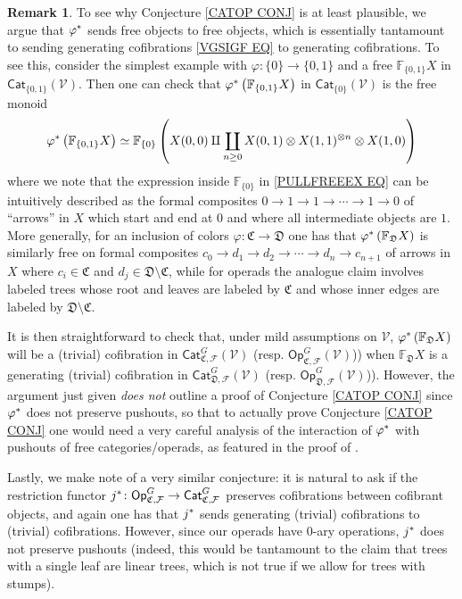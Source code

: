 \documentclass[a4paper,10pt
,draft
]{article}%
\numberwithin{equation}{section}
\numberwithin{figure}{section}
\theoremstyle{definition} %
\newtheorem{remark}[equation]{Remark}%
\newcommand{\F}{\ensuremath{\mathcal F}}
\newcommand{\V}{\ensuremath{\mathcal V}}
\newcommand{\1}{\ensuremath{\mathbbm 1}}%
\begin{document}
\begin{remark}
To see why Conjecture \ref{CATOP CONJ} is at least plausible,
we argue that $\varphi^{\**}$ sends free objects to free objects, 
which is essentially tantamount to
sending generating cofibrations \eqref{VGSIGF EQ} to generating cofibrations.
%
To see this, consider the simplest example 
with
$\varphi \colon \{0\} \to \{0,1\}$
and a free $\mathbb{F}_{\{0,1\}}X $ in $\mathsf{Cat}_{\{0,1\}}(\V)$.
Then one can check that 
$\varphi^{\**} \left( \mathbb{F}_{\{0,1\}}X \right)$ in $\mathsf{Cat}_{\{0\}}(\V)$ is the free monoid
\begin{equation}\label{PULLFREEEX EQ}
	\varphi^{\**} \left( \mathbb{F}_{\{0,1\}}X \right)
\simeq
	\mathbb{F}_{\{0\}}
	\left(X(0,0) \amalg 
	\coprod_{n \geq 0}
	X(0,1)\otimes X(1,1)^{\otimes n} \otimes X(1,0) 
	\right)
\end{equation}
where we note that the expression inside
$\mathbb{F}_{\{0\}}$
in \eqref{PULLFREEEX EQ}
can be intuitively described as the formal composites
$0 \to 1 \to 1 \to \cdots \to 1 \to 0$
of ``arrows'' in $X$ which start and end at $0$ and where all intermediate objects are $1$.
%
More generally, for an inclusion of colors 
$\varphi \colon \mathfrak{C} \to \mathfrak{D}$
one has that 
$\varphi^{\**} \left(\mathbb{F}_{\mathfrak{D}} X\right)$
is similarly free on formal composites
$c_0 \to d_1 \to d_2 \to \cdots \to d_n \to c_{n+1}$
of arrows in $X$
where $c_i \in \mathfrak{C}$
and $d_j \in \mathfrak{D} \setminus \mathfrak{C}$,
while for operads the analogue claim involves labeled trees whose root and leaves are labeled by $\mathfrak{C}$
and whose inner edges are labeled by 
$\mathfrak{D} \setminus \mathfrak{C}$.
 
It is then straightforward to check that, under mild assumptions on $\V$,
$\varphi^{\**} \left(\mathbb{F}_{\mathfrak{D}} X \right)$
will be a (trivial) cofibration in 
$\mathsf{Cat}^G_{\mathfrak{C},\F}(\V)$
(resp. $\mathsf{Op}^G_{\mathfrak{C},\F}(\V)$))
when $\mathbb{F}_{\mathfrak{D}} X$
is a generating (trivial) cofibration
in $\mathsf{Cat}^G_{\mathfrak{D},\F}(\V)$
(resp. $\mathsf{Op}^G_{\mathfrak{D},\F}(\V)$)).
However, the argument just given \emph{does not} outline a proof of Conjecture \ref{CATOP CONJ}
since $\varphi^{\**}$ does not preserve pushouts, 
so that to actually prove Conjecture \ref{CATOP CONJ}
one would need a very careful analysis of the interaction of $\varphi^{\**}$ with pushouts of free categories/operads, 
as featured in the proof of \cite[Thm. 1.15]{BM13}.

Lastly, we make note of a very similar conjecture:
it is natural to ask if the restriction functor
$j^{\**} \colon \mathsf{Op}_{\mathfrak{C},\F}^G 
\to \mathsf{Cat}_{\mathfrak{C},\F}^G$
preserves cofibrations between cofibrant objects,
and again one has that $j^{\**}$ 
sends generating (trivial) cofibrations to (trivial) cofibrations.
However, since our operads have $0$-ary operations, %
$j^{\**}$ does not preserve pushouts
(indeed, this would be tantamount to the claim that trees with a single leaf are linear trees, which is not true if we allow for trees with stumps).
\end{remark}
\end{document}
